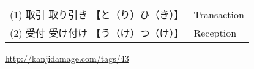 \begin{center}\begin{tabular}{ll}
(1) {取引} {取り引き} {【と（り）ひ（き）】} &  Transaction\\
(2) {受付} {受け付け} {【う（け）つ（け）】} &  Reception\\
\end{tabular}\end{center}


\Link \href{http://kanjidamage.com/tags/43}{http://kanjidamage.com/tags/43}








